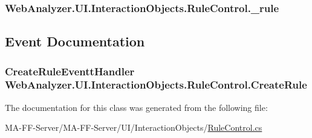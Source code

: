 \subsubsection[{\+\_\+rule}]{ Web\+Analyzer.\+U\+I.\+Interaction\+Objects.\+Rule\+Control.\+\_\+rule\hspace{0.3cm}{\ttfamily [private]}}\label{class_web_analyzer_1_1_u_i_1_1_interaction_objects_1_1_rule_control_aa89ec17ff2fc96e2868147d3a1bfe474}


\subsection{Event Documentation}
\hypertarget{class_web_analyzer_1_1_u_i_1_1_interaction_objects_1_1_rule_control_a7bf67a13195858fc69b81997bb629ec5}{}
\subsubsection[{Create\+Rule}]{\setlength{\rightskip}{0pt plus 5cm}Create\+Rule\+Eventt\+Handler Web\+Analyzer.\+U\+I.\+Interaction\+Objects.\+Rule\+Control.\+Create\+Rule}\label{class_web_analyzer_1_1_u_i_1_1_interaction_objects_1_1_rule_control_a7bf67a13195858fc69b81997bb629ec5}


The documentation for this class was generated from the following file\+:\begin{DoxyCompactItemize}
\item 
M\+A-\/\+F\+F-\/\+Server/\+M\+A-\/\+F\+F-\/\+Server/\+U\+I/\+Interaction\+Objects/\hyperlink{_rule_control_8cs}{Rule\+Control.\+cs}\end{DoxyCompactItemize}
